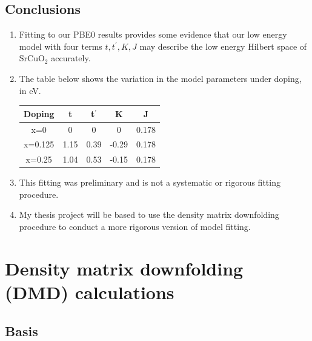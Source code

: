 \documentclass{article}
\begin{document}
\subsection{Conclusions}
\begin{enumerate}
\item Fitting to our PBE0 results provides some evidence that our low energy model with four terms $t, t^\prime, K, J$ may describe the low energy Hilbert space of SrCuO$_2$ accurately.

\item The table below shows the variation in the model parameters under doping, in eV.

\begin{center}
\begin{tabular}{ c c c c c }
Doping & t & t$^\prime$ & K & J \\ 
\hline
x=0 & 0 & 0 & 0 & 0.178 \\
x=0.125& 1.15&  0.39& -0.29& 0.178 \\
x=0.25 & 1.04& 0.53& -0.15&0.178 \\
\end{tabular}
\end{center}

\item This fitting was preliminary and is not a systematic or rigorous fitting procedure. 

\item My thesis project will be based to use the density matrix downfolding procedure to conduct a more rigorous version of model fitting.
\end{enumerate}

\section{Density matrix downfolding (DMD) calculations}
\subsection{Basis}
\end{document}
